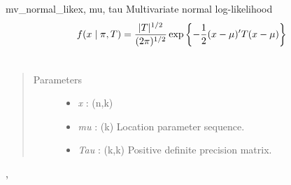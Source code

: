 \hypertarget{pymc.distributions.mv_normal_like}{}\begin{funcdesc}{mv\_normal\_like}{x, mu, tau}
Multivariate normal log-likelihood
\begin{gather}
\begin{split}f(x \mid \pi, T) = \frac{|T|^{1/2}}{(2\pi)^{1/2}} \exp\left\{ -\frac{1}{2} (x-\mu)^{\prime}T(x-\mu) \right\}\end{split}\notag\\\begin{split}\end{split}\notag
\end{gather}\begin{quote}\begin{description}
\item[Parameters] \leavevmode\begin{itemize}
\item {} 
\emph{x} : (n,k)

\item {} 
\emph{mu} : (k) Location parameter sequence.

\item {} 
\emph{Tau} : (k,k) Positive definite precision matrix.

\end{itemize}

\end{description}\end{quote}




\hyperlink{pymc.distributions.mv_normal_chol_like}{}, \hyperlink{pymc.distributions.mv_normal_cov_like}{}


\end{funcdesc}

